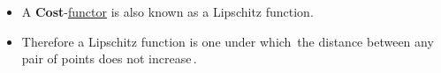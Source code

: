 \begin{itemize}
    \item A \textbf{Cost}-\hyperref[D2.69]{functor} is also known as a Lipschitz function.
    \item Therefore a Lipschitz function is one under which \,the distance between any pair of points does not increase\,.
  \end{itemize}
